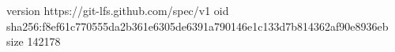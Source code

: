 version https://git-lfs.github.com/spec/v1
oid sha256:f8ef61c770555da2b361e6305de6391a790146e1c133d7b814362af90e8936eb
size 142178
